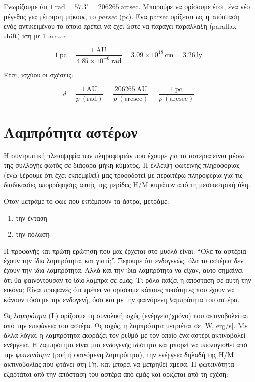 Γνωρίζουμε ότι $1 \ \text{rad} = 57.3^{\circ} = 206265 \ \text{arcsec}$. Μπορούμε να ορίσουμε έτσι, ένα νέο μέγεθος για μέτρηση μήκους, το \textit{parsec} (pc). Ένα parsec ορίζεται ως η απόσταση ενός αντικειμένου το οποίο πρέπει να έχει ώστε να παράγει παράλλαξη (parallax shift) ίση με 1 arcsec.

\begin{equation}
    1 \ \text{pc} = \frac{1 \ \text{AU}}{4.85 \times 10^{-6} \ \text{rad}} = 3.09 \times 10^{18} \ \text{cm} = 3.26 \ \text{ly}
\end{equation}

Έτσι, ισχύου οι σχέσεις:

\begin{equation}
    d = \frac{1 \ \text{AU}}{p \ (\text{rad})} = \frac{206265 \ \text{AU}}{p \ (\text{arcsec})} = \frac{1 \ \text{pc}}{p \ (\text{arcsec})}
\end{equation}





\section{Λαμπρότητα αστέρων}

Η συντριπτική πλειοψηφία των πληροφοριών που έχουμε για τα αστέρια είναι μέσω της συλλογής φωτός σε διάφορα μήκη κύματος. Η έλλειψη φωτεινής πληροφορίας (ενώ ξέρουμε ότι έχει εκπεμφθεί) μας τροφοδοτεί με περαιτέρω πληροφορία για τις διαδικασίες απορρόφησης αυτής της μερίδας Η/Μ κυμάτων από τη μεσοαστρική ύλη.

Όταν μετράμε το φως που εκπέμπουν τα άστρα, μετράμε:
\begin{enumerate}
    \item την ένταση
    \item την πόλωση
\end{enumerate}

Η προφανής και πρώτη ερώτηση που μας έρχεται στο μυαλό είναι:
``Όλα τα αστέρια έχουν την ίδια λαμπρότητα, και γιατί;''. Ξερουμε ότι ενδογενώς, όλα τα αστέρια δεν έχουν την ίδια λαμπρότητα. Αλλά και την ίδια λαμπρότητα να είχαν, αυτό σημαίνει ότι θα φαινόντουσαν το ίδιο λαμπρά σε εμάς; Τι ρόλο παίζει η απόσταση σε αυτή την εικόνα; Είναι προφανές ότι πρέπει να ορίσουμε κάποιες ποσότητες που έχουν να κάνουν τόσο με την ενδογενή, όσο και με την φαινόμενη λαμπρότητα του αστέρα.

Ως \textit{λαμπρότητα} (L) ορίζουμε τη συνολική ισχύς (ενέργεια/χρόνο) που ακτινοβολείται από την επιφάνεια του αστέρα. Ως ισχύς, η λαμπρότητα μετριέται σε [W, erg/s]. Με άλλα λόγια, η λαμπρότητα εκφράζει τον ρυθμό με τον οποίο ένα αστέρι ακτινοβολεί ενέργεια. Η λαμπρότητα είναι μια ενδογενής ιδιότητα και μπορεί να υπολογισθεί από την \textit{φωτεινότητα} (ροή ή φαινόμενη λαμπρότητα), την ενέργεια δηλαδή της Η/Μ ακτινοβολίας που φτάνει στη Γη, και μπορεί να μετρηθεί άμεσα. Η φωτεινότητα εξαρτάται από την απόσταση του αστέρα από εμάς και ορίζεται από τη σχέση:

